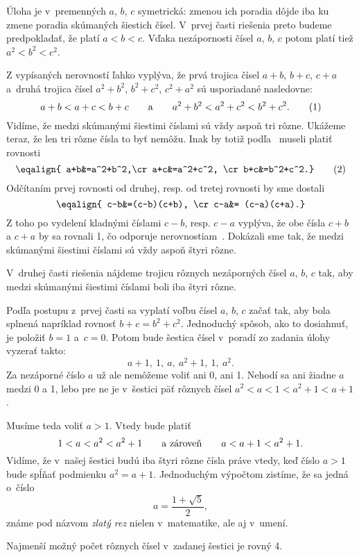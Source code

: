 {%
Úloha je v~premenných $a$, $b$, $c$ symetrická:
zmenou ich poradia dôjde iba ku zmene poradia skúmaných šiestich
čísel. V~prvej časti riešenia preto budeme predpokladať, že platí $a<b<c$.
Vďaka nezápornosti čísel $a$, $b$, $c$ potom platí tiež
$a^2<b^2<c^2$.

Z vypísaných nerovností ľahko vyplýva, že prvá trojica čísel $a+b$, $b+c$, $c+a$ a~druhá trojica čísel $a^2+b^2$, $b^2+c^2$,
$c^2+a^2$ sú usporiadané nasledovne:
$$
a+b<a+c<b+c\qquad\hbox{a}\qquad a^2+b^2<a^2+c^2<b^2+c^2.
\tag1$$
Vidíme, že medzi skúmanými šiestimi číslami sú vždy aspoň tri rôzne.
Ukážeme teraz, že len tri rôzne čísla to byť nemôžu.
Inak by totiž podľa~ museli platiť rovnosti
$$
\eqalign{
a+b&=a^2+b^2,\cr
a+c&=a^2+c^2, \cr
b+c&=b^2+c^2.} \tag2
$$
Odčítaním prvej rovnosti od druhej, resp. od tretej rovnosti by sme
dostali
$$
\eqalign{
c-b&=(c-b)(c+b), \cr
c-a&= (c-a)(c+a).}
$$
Z toho po vydelení kladnými číslami $c-b$, resp. $c-a$ vyplýva,
že obe čísla $c+b$ a $c+a$ by sa rovnali 1, čo odporuje
nerovnostiam~. Dokázali sme tak, že medzi skúmanými
šiestimi číslami sú vždy aspoň štyri rôzne.

\medskip
V~druhej časti riešenia nájdeme trojicu rôznych nezáporných
čísel $a$, $b$, $c$ tak, aby medzi skúmanými šiestimi číslami boli iba
štyri rôzne.

Podľa postupu z~prvej časti sa vyplatí voľbu čísel $a$, $b$, $c$
začať tak, aby bola splnená napríklad rovnosť $b+c=b^2+c^2$.
Jednoduchý spôsob, ako to dosiahnuť, je položiť $b=1$ a~$c=0$.
Potom bude šestica čísel v~poradí zo zadania úlohy vyzerať takto:
$$
a+1,\ 1,\ a,\ a^2+1,\ 1,\ a^2.
$$
Za nezáporné číslo $a$ už ale nemôžeme voliť ani 0, ani 1.
Nehodí sa ani žiadne $a$ medzi 0 a 1, lebo pre ne je v~šestici
päť rôznych čísel $a^2<a<1<a^2+1<a+1$.

Musíme teda voliť $a>1$. Vtedy bude platiť
$$
1<a<a^2<a^2+1\qquad\hbox{a zároveň}\qquad a<a+1<a^2+1.
$$
Vidíme, že v~našej šestici budú iba štyri rôzne čísla práve vtedy, keď
číslo $a>1$ bude spĺňať podmienku $a^2=a+1$. Jednoduchým výpočtom
zistíme, že sa jedná o~číslo
$$
a=\frac{1+\sqrt5}{2},
$$
známe pod názvom {\it zlatý rez\/} nielen v~matematike, ale aj v~umení.

\Zav
Najmenší možný počet rôznych čísel v~zadanej
šestici je rovný 4.

}
